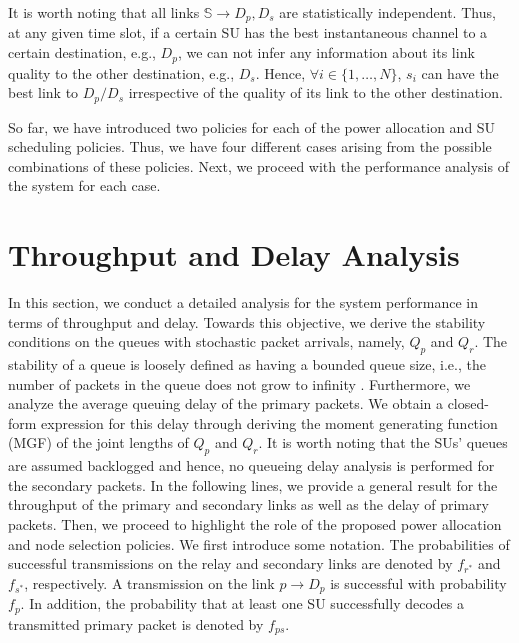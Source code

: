 \documentclass[journal,twocolumn]{IEEEtran}
\begin{document}
It is worth noting that all links $\mathbb{S} \rightarrow D_{p},D_{s}$ are statistically independent. Thus, at any given time slot, if a certain
SU has the best instantaneous channel to a certain destination, e.g., $D_{p}$, we can not infer any information about its link quality to the
other destination, e.g., $D_{s}$. Hence, $\forall i \in \{1,\hdots,N\}$, $s_{i}$ can have the best link to $D_{p}/D_{s}$ irrespective of the quality of
its link to the other destination.

So far, we have introduced two policies for each of the power allocation and SU scheduling policies. Thus, we have four different cases
arising from the possible combinations of these policies. Next, we proceed with the performance analysis of the system for each case.

\section{Throughput and Delay Analysis}
\label{sect:analysis}
In this section, we conduct a detailed analysis for the system performance in terms of throughput and delay. Towards this objective, we derive
the stability conditions on the queues with stochastic packet arrivals, namely, $Q_{p}$ and $Q_{r}$. The stability of a queue is loosely defined as
having a bounded queue size, i.e., the number of packets in the queue does not grow to infinity \cite{sadek}. Furthermore, we analyze the average queuing delay of the primary packets. We obtain a closed-form expression for this delay through deriving the moment generating function (MGF) of the joint lengths of $Q_{p}$ and $Q_{r}$. It is worth noting that the SUs' queues are assumed backlogged and hence, no queueing delay analysis is performed for the secondary packets. In the following lines, we provide a general result for the throughput of the primary and secondary links as well as the delay of primary packets.
Then, we proceed to highlight the role of the proposed power allocation and node selection policies.
We first introduce some notation. The probabilities of successful transmissions on the relay and secondary links are denoted by $f_{r^*}$ and $f_{s^*}$, respectively. A transmission on the link $p \to D_{p}$ is successful with probability $f_{p}$. In addition, the probability that at least one SU successfully decodes a transmitted primary packet is denoted by $f_{ps}$. 
\end{document}
